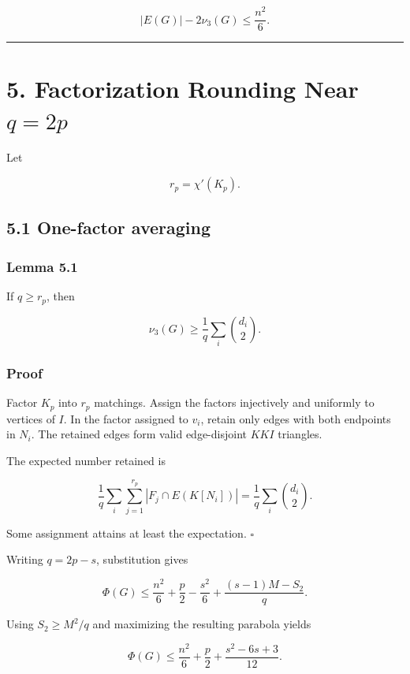 \documentclass[11pt,a4paper]{article}
\begin{document}
\[
|E(G)|-2\nu_3(G)
\le
\frac{n^2}{6}.
\tag{4.6}
\]

\begin{center}\rule{0.5\linewidth}{0.5pt}\end{center}

\section{\texorpdfstring{5. Factorization Rounding Near \(q=2p\)}{5. Factorization Rounding Near q=2p}}\label{factorization-rounding-near-q2p}

Let

\[
r_p=\chi'(K_p).
\]

\subsection{5.1 One-factor averaging}\label{one-factor-averaging}

\subsubsection{Lemma 5.1}\label{lemma-5.1}

If \(q\ge r_p\), then

\[
\boxed{
\nu_3(G)
\ge
\frac1q\sum_i\binom{d_i}{2}.
}
\tag{5.1}
\]

\subsubsection{Proof}\label{proof-3}

Factor \(K_p\) into \(r_p\) matchings. Assign the factors injectively and uniformly to vertices of \(I\). In the factor assigned to \(v_i\), retain only edges with both endpoints in \(N_i\). The retained edges form valid edge-disjoint \(KKI\) triangles.

The expected number retained is

\[
\frac1q\sum_i\sum_{j=1}^{r_p}|F_j\cap E(K[N_i])|
=
\frac1q\sum_i\binom{d_i}{2}.
\]

Some assignment attains at least the expectation. \(\square\)

Writing \(q=2p-s\), substitution gives

\[
\Phi(G)
\le
\frac{n^2}{6}+\frac p2-\frac{s^2}{6}
+
\frac{(s-1)M-S_2}{q}.
\tag{5.2}
\]

Using \(S_2\ge M^2/q\) and maximizing the resulting parabola yields

\[
\boxed{
\Phi(G)
\le
\frac{n^2}{6}+\frac p2+\frac{s^2-6s+3}{12}.
}
\tag{5.3}
\]
\end{document}
